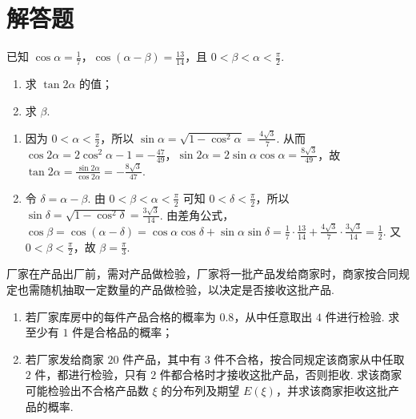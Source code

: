 \section{解答题}
\begin{problem}
已知 \(\cos\alpha = \frac{1}{7}\)，\(\cos(\alpha - \beta) = \frac{13}{14}\)，且 \(0 < \beta < \alpha < \frac{\pi}{2}\).

\begin{enumerate}
\item 求 \(\tan 2\alpha\) 的值；
\item 求 \(\beta\).
\end{enumerate}
\end{problem}

\begin{solution}
\begin{enumerate}
\item 因为 \(0<\alpha<\frac{\pi}{2}\)，所以 \(\sin\alpha=\sqrt{1-\cos^2\alpha}=\frac{4\sqrt{3}}{7}\). 从而 \(\cos 2\alpha=2\cos^2\alpha-1=-\frac{47}{49}\)，\(\sin 2\alpha=2\sin\alpha\cos\alpha=\frac{8\sqrt{3}}{49}\)，故 \(\tan 2\alpha=\frac{\sin 2\alpha}{\cos 2\alpha}=-\frac{8\sqrt{3}}{47}\).
\item 令 \(\delta=\alpha-\beta\). 由 \(0<\beta<\alpha<\frac{\pi}{2}\) 可知 \(0<\delta<\frac{\pi}{2}\)，所以 \(\sin\delta=\sqrt{1-\cos^2\delta}=\frac{3\sqrt{3}}{14}\). 由差角公式，\(\cos\beta=\cos(\alpha-\delta)=\cos\alpha\cos\delta+\sin\alpha\sin\delta=\frac{1}{7}\cdot\frac{13}{14}+\frac{4\sqrt{3}}{7}\cdot\frac{3\sqrt{3}}{14}=\frac{1}{2}\). 又 \(0<\beta<\frac{\pi}{2}\)，故 \(\beta=\frac{\pi}{3}\).
\end{enumerate}
\end{solution}


\begin{problem}
厂家在产品出厂前，需对产品做检验，厂家将一批产品发给商家时，商家按合同规定也需随机抽取一定数量的产品做检验，以决定是否接收这批产品.

\begin{enumerate}
\item 若厂家库房中的每件产品合格的概率为 \(0.8\)，从中任意取出 \(4\) 件进行检验. 求至少有 \(1\) 件是合格品的概率；
\item 若厂家发给商家 \(20\) 件产品，其中有 \(3\) 件不合格，按合同规定该商家从中任取 \(2\) 件，都进行检验，只有 \(2\) 件都合格时才接收这批产品，否则拒收. 求该商家可能检验出不合格产品数 \(\xi\) 的分布列及期望 \(E(\xi)\)，并求该商家拒收这批产品的概率.
\end{enumerate}
\end{problem}

